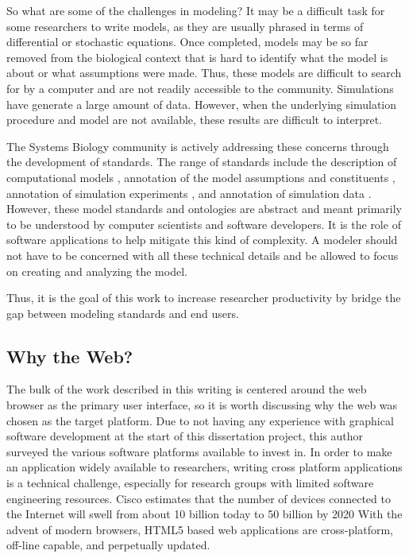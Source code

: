 So what are some of the challenges in modeling?
It may be a difficult task for some researchers to write models, as they are usually phrased in terms of differential or stochastic equations.
Once completed, models may be so far removed from the biological context that is hard to identify what the model is about or what assumptions were made.
Thus, these models are difficult to search for by a computer and are not readily accessible to the community.
Simulations have generate a large amount of data.
However, when the underlying simulation procedure and model are not available, these results are difficult to interpret.

The Systems Biology community is actively addressing these concerns through the development of standards.
The range of standards include the description of computational models \autocite{hucka:2002d, LloydCellML2004}, annotation of the model assumptions and constituents \autocite{novere2005minimum}, annotation of simulation experiments \autocite{kohn2008sed}, and annotation of simulation data \autocite{dada2010sbrml}.
However, these model standards and ontologies are abstract and meant primarily to be understood by computer scientists and software developers.
It is the role of software applications to help mitigate this kind of complexity.
A modeler should not have to be concerned with all these technical details and be allowed to focus on creating and analyzing the model.

Thus, it is the goal of this work to increase researcher productivity by bridge the gap between modeling standards and end users.

\subsection{Why the Web?}

The bulk of the work described in this writing is centered around the web browser as the primary user interface, so it is worth discussing why the web was chosen as the target platform.
Due to not having any experience with graphical software development at the start of this dissertation project, this author surveyed the various software platforms available to invest in.
In order to make an application widely available to researchers, writing cross platform applications is a technical challenge, especially for research groups with limited software engineering resources. \autocite{cusumano1999netscape}
Cisco estimates that the number of devices connected to the Internet will swell from about 10 billion today to 50 billion by 2020 \autocite{clark2014internet}
With the advent of modern browsers, HTML5 based web applications are cross-platform, off-line capable, and perpetually updated. \autocite{o2007web}


